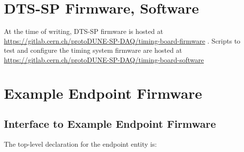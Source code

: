 \documentclass{dune}
\begin{document}
\clearpage

\appendix

\section{DTS-SP Firmware, Software}

At the time of writing, DTS-SP firmware is hosted at \url{https://gitlab.cern.ch/protoDUNE-SP-DAQ/timing-board-firmware} . Scripts to test and configure the timing system firmware are hosted at \url{https://gitlab.cern.ch/protoDUNE-SP-DAQ/timing-board-software}



\section{Example Endpoint Firmware}

\subsection{Interface to Example Endpoint Firmware }

The top-level declaration for the endpoint entity is:
\end{document}
